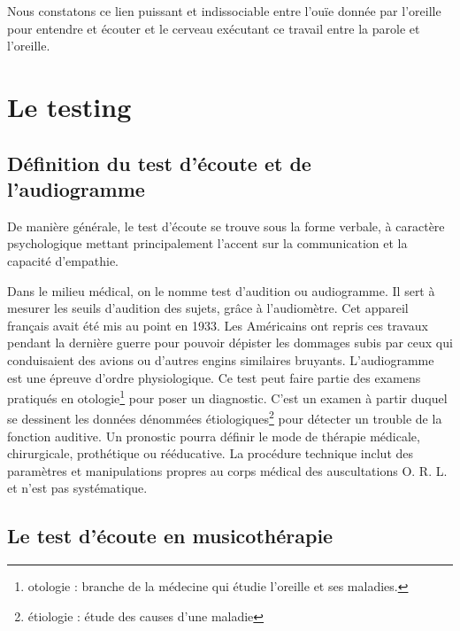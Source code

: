Nous constatons ce lien puissant et indissociable  entre l'ouïe donnée
par l'oreille pour entendre et écouter et le cerveau exécutant ce
travail entre la 
parole et l'oreille.








\chapter{Le testing}

\section{Définition du test d'écoute et de l'audiogramme}

De manière générale, le test d'écoute se trouve sous la forme verbale,
à caractère  
psychologique mettant principalement l'accent sur la communication
et la capacité d'empathie.

Dans le milieu médical, on le nomme test d'audition ou audiogramme. Il
sert à mesurer les seuils d'audition des sujets, grâce à l'audiomètre. Cet 
appareil français avait été mis au point en 1933. Les Américains
ont repris ces travaux pendant la dernière guerre pour pouvoir dépister
les dommages subis par ceux qui conduisaient des avions ou d'autres
engins similaires bruyants.
  L'audiogramme est une épreuve d'ordre physiologique. Ce test peut faire partie des examens  pratiqués en otologie\footnote{otologie : branche de la médecine
  	qui étudie l'oreille et ses maladies.} pour poser un diagnostic. 
   C'est un examen à partir duquel se
  dessinent les données dénommées étiologiques\footnote{étiologie : étude des causes
  	d'une maladie} pour détecter un trouble de la fonction auditive. Un pronostic pourra définir le mode de thérapie
médicale, chirurgicale, prothétique ou rééducative. La procédure
technique inclut des paramètres et manipulations propres au corps
médical des auscultations O. R. L. et  n'est pas systématique.






\section{Le test d'écoute en musicothérapie}

